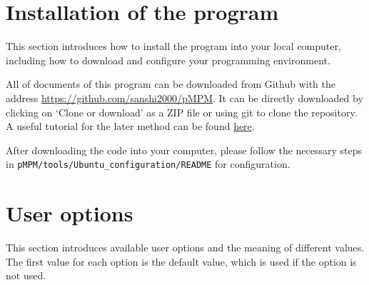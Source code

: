 \documentclass[10pt,a4paper]{article}
\newcommand{\code}[1]{\texttt{#1}}
\begin{document}
\begin{appendices}
\section{Installation of the program}
\label{app:install}
This section introduces how to install the program into your local computer, including how to download and configure your programming environment.  

All of documents of this program can be downloaded from Github with the address \url{https://github.com/sanshi2000/pMPM}. It can be directly downloaded by clicking on `Clone or download' as a ZIP file or using git to clone the repository. A useful tutorial for the later method can be found \href{https://kbroman.org/github\_tutorial/pages/fork.html}{here}. 

After downloading the code into your computer, please follow the necessary steps in \code{pMPM/tools/Ubuntu\_configuration/README} for configuration.


\section{User options}
\label{app:option}
This section introduces available user options and the meaning of different values. The first value for each option is the default value, which is used if the option is not used.


\end{appendices}
\end{document}
